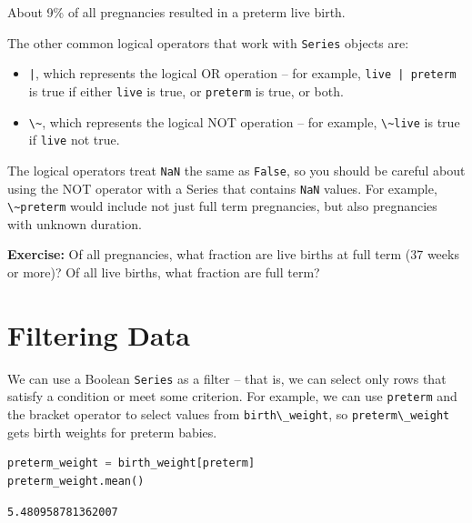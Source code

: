 About 9\% of all pregnancies resulted in a preterm live birth.

The other common logical operators that work with
\passthrough{\lstinline!Series!} objects are:

\begin{itemize}
\item
  \passthrough{\lstinline!|!}, which represents the logical OR operation
  -- for example, \passthrough{\lstinline!live | preterm!} is true if
  either \passthrough{\lstinline!live!} is true, or
  \passthrough{\lstinline!preterm!} is true, or both.
\item
  \passthrough{\lstinline!\~!}, which represents the logical NOT
  operation -- for example, \passthrough{\lstinline!\~live!} is true if
  \passthrough{\lstinline!live!} not true.
\end{itemize}

The logical operators treat \passthrough{\lstinline!NaN!} the same as
\passthrough{\lstinline!False!}, so you should be careful about using
the NOT operator with a Series that contains
\passthrough{\lstinline!NaN!} values. For example,
\passthrough{\lstinline!\~preterm!} would include not just full term
pregnancies, but also pregnancies with unknown duration.

\textbf{Exercise:} Of all pregnancies, what fraction are live births at
full term (37 weeks or more)? Of all live births, what fraction are full
term?

\section{Filtering Data}\label{filtering-data}

We can use a Boolean \passthrough{\lstinline!Series!} as a filter --
that is, we can select only rows that satisfy a condition or meet some
criterion. For example, we can use \passthrough{\lstinline!preterm!} and
the bracket operator to select values from
\passthrough{\lstinline!birth\_weight!}, so
\passthrough{\lstinline!preterm\_weight!} gets birth weights for preterm
babies.

\begin{lstlisting}[language=Python,style=source]
preterm_weight = birth_weight[preterm]
preterm_weight.mean()
\end{lstlisting}

\begin{lstlisting}[style=output]
5.480958781362007
\end{lstlisting}


